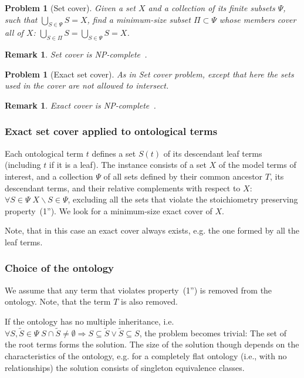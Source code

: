\documentclass[9pt]{article}
\newcounter{pbm}
\newcounter{def}
\newcounter{rm}
\begin{document}
\newtheorem{setc}[pbm]{Problem}
\begin{setc}[Set cover]
Given a set $X$ and a collection of its finite subsets $\Psi$, such that $\bigcup_{S \in \Psi} S = X$, find a minimum-size subset $\Pi \subset \Psi$ whose members cover all of $X$: $\bigcup_{S \in \Pi} S = \bigcup_{S \in \Psi} S = X$.
\end{setc}
\newtheorem{rem}[rm]{Remark}
\begin{rem}
 Set cover is \textit{NP}-complete~\citep{karp72}.
\end{rem}

\newtheorem{esetc}[pbm]{Problem}
\begin{esetc}[Exact set cover]
As in \emph{Set cover} problem, except that here the sets used in the cover are not allowed to intersect. 
\end{esetc}
\newtheorem{rem1}[rm]{Remark}
\begin{rem1}
Exact cover is \textit{NP}-complete~\citep{Goldreich2008}.
\end{rem1}

\subsubsection*{Exact set cover applied to ontological terms}
Each ontological term $t$ defines a set $S(t)$ of its descendant leaf terms (including $t$ if it is a leaf). The instance consists of a set $X$ of the model terms of interest, and a collection $\Psi$ of all sets defined by their common ancestor $T$, its descendant terms, and their relative complements with respect to $X$: $\forall S \in \Psi \; X\backslash S \in \Psi$, excluding all the sets that violate the stoichiometry preserving property~(1''). We look for a minimum-size exact cover of $X$. 

Note, that in this case an exact cover always exists, e.g. the one formed by all the leaf terms.

\subsubsection*{Choice of the ontology}
We assume that any term that violates property~(1'') is removed from the ontology. Note, that the term $T$ is also removed.

If the ontology has no multiple inheritance, i.e. $\forall S, \tilde{S} \in \Psi \; S \cap \tilde{S} \neq \emptyset \Rightarrow S \subseteq \tilde{S} \lor \tilde{S} \subseteq S$, the problem becomes trivial: The set of the root terms forms the solution. The size of the solution though depends on the characteristics of the ontology, e.g. for a completely flat ontology (i.e., with no relationships) the solution consists of singleton equivalence classes.
\end{document}
